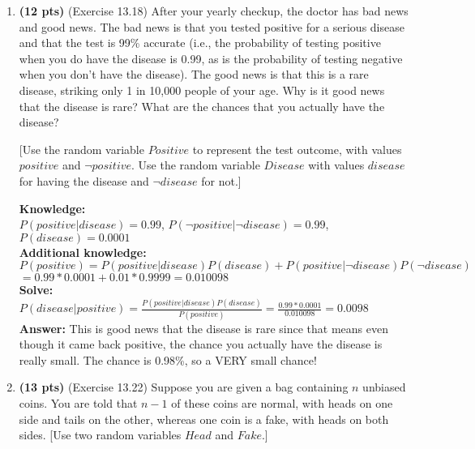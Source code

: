 \documentclass{article}
\begin{document}
\begin{enumerate}

\item \textbf{(12 pts)} (Exercise 13.18) After your yearly checkup, the doctor has bad news and good news. The bad news is that you tested positive for a serious disease and that the test is 99\% accurate (i.e., the probability of testing positive when you do have the disease is 0.99, as is the probability of testing
negative when you don’t have the disease). The good news is that this is a rare disease, striking only 1 in 10,000 people of your age. Why is it good news that the disease is rare? What are the chances that you actually have the disease?

[Use the random variable $Positive$ to represent the test outcome, with values $positive$ and $\neg positive$. Use the random variable $Disease$ with values $disease$ for having the disease and $\neg disease$ for not.]

\color{blue}
    \textbf{Knowledge:}\\
    $P(positive|disease)=0.99$, $P(\neg positive|\neg disease)=0.99$, $P(disease)=0.0001$\\
    \textbf{Additional knowledge:}\\
    $P(positive)=P(positive|disease)P(disease)+P(positive|\neg disease)P(\neg disease)$\\$=0.99*0.0001+0.01*0.9999=0.010098$\\
    \textbf{Solve:}\\
    $P(disease|positive)=\frac{P(positive|disease)P(disease)}{P(positive)}=\frac{0.99*0.0001}{0.010098}=0.0098$\\
    \textbf{Answer:} This is good news that the disease is rare since that means even though it came back positive, the chance you actually have the disease is really small. The chance is 0.98\%, so a VERY small chance!
\color{black}



\item \textbf{(13 pts)} (Exercise 13.22) Suppose you are given a bag containing $n$ unbiased coins. You are told that $n - 1$ of these coins are normal, with heads on one side and tails on the other, whereas one coin is a fake, with heads on both sides. [Use two random variables $Head$ and $Fake$.]


\end{enumerate}
\end{document}
